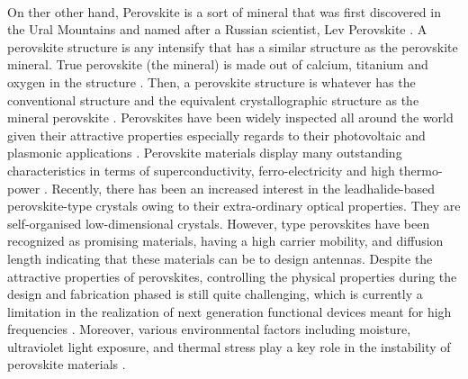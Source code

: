 \documentclass[12pt]{suhbook}
\begin{document}
%
%
\\On ther other hand,  Perovskite is a sort of mineral that was first discovered in the Ural Mountains and named after a Russian scientist, Lev Perovskite  \cite{park2016organic}. A perovskite structure is any intensify that has a similar structure as the perovskite mineral. True perovskite (the mineral) is made out of calcium, titanium and oxygen in the structure . Then, a perovskite structure is whatever has the conventional structure  and the equivalent crystallographic structure as the mineral perovskite \cite{chanana2017colour}. Perovskites have been widely inspected all around the world given their attractive properties especially regards to their photovoltaic and plasmonic applications \cite{song2015perovskite}. Perovskite materials display many outstanding characteristics in terms of superconductivity, ferro-electricity and high thermo-power \cite{kulkarni2012mixed}. Recently, there has been an increased interest in the leadhalide-based perovskite-type crystals owing to their extra-ordinary optical properties. They are self-organised low-dimensional crystals. However,  type perovskites have been recognized as promising materials, having a high carrier mobility, and diffusion length indicating that these materials can be to design antennas. Despite the attractive properties of perovskites, controlling the physical properties during the design and fabrication phased is still quite challenging, which is currently a limitation in the realization of next generation functional devices meant for high frequencies \cite{ahmad2017instability}. Moreover, various environmental factors including moisture, ultraviolet light exposure, and thermal stress play a key role in the instability of perovskite materials \cite{green2014emergence}.
\end{document}
